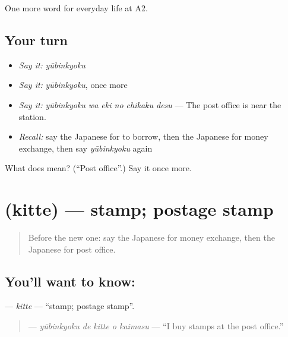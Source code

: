 \begin{grammarlens}[title={What you've built}]
One more word for everyday life at A2.
\end{grammarlens}

\subsection*{Your turn}
\begin{itemize}
\raggedright
  \item \emph{Say it:} \emph{yūbinkyoku}
  \item \emph{Say it:} \emph{yūbinkyoku}, once more
  \item \emph{Say it:} \emph{yūbinkyoku wa eki no chikaku desu} — The post office is near the station.
  \item \emph{Recall:} say the Japanese for to borrow, then the Japanese for money exchange, then say \emph{yūbinkyoku} again
\end{itemize}

\begin{tcolorbox}[breakable,colback=teal!4,colframe=teal!35!black,title={Before you move on}]
What does  mean? (\textquotedblleft{}Post office\textquotedblright{}.) Say it once more.
\end{tcolorbox}
\section[\texorpdfstring{\ja{きって} (kitte)}{きって (kitte)}]{ (kitte) — stamp; postage stamp}

\label{lesson:JA-C188-kitte}



\begin{quote}
Before the new one: say the Japanese for money exchange, then the Japanese for post office.
\end{quote}

\subsection*{You'll want to know: }
\textbf{} — \emph{kitte} — \textquotedblleft{}stamp; postage stamp\textquotedblright{}.

\begin{quote}
\textbf{  } — \emph{yūbinkyoku de kitte o kaimasu} — \textquotedblleft{}I buy stamps at the post office.\textquotedblright{}
\end{quote}

